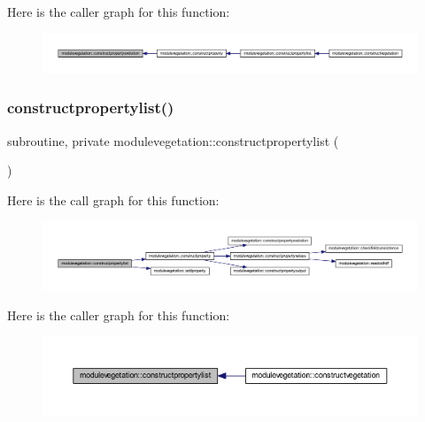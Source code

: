 Here is the caller graph for this function\+:\nopagebreak
\begin{figure}[H]
\begin{center}
\leavevmode
\includegraphics[width=350pt]{namespacemodulevegetation_ac6177be389c51bc5c4360fab4db5d775_icgraph}
\end{center}
\end{figure}
\mbox{\label{namespacemodulevegetation_aa8b34aba441105ada4ef33de5fb88008}} 
\subsubsection{\texorpdfstring{constructpropertylist()}{constructpropertylist()}}
{\footnotesize\ttfamily subroutine, private modulevegetation\+::constructpropertylist (\begin{DoxyParamCaption}{ }\end{DoxyParamCaption})\hspace{0.3cm}{\ttfamily [private]}}

Here is the call graph for this function\+:\nopagebreak
\begin{figure}[H]
\begin{center}
\leavevmode
\includegraphics[width=350pt]{namespacemodulevegetation_aa8b34aba441105ada4ef33de5fb88008_cgraph}
\end{center}
\end{figure}
Here is the caller graph for this function\+:\nopagebreak
\begin{figure}[H]
\begin{center}
\leavevmode
\includegraphics[width=350pt]{namespacemodulevegetation_aa8b34aba441105ada4ef33de5fb88008_icgraph}
\end{center}
\end{figure}
\mbox{\label{namespacemodulevegetation_a107cf428abfe6d2909a01c200803e576}} 
